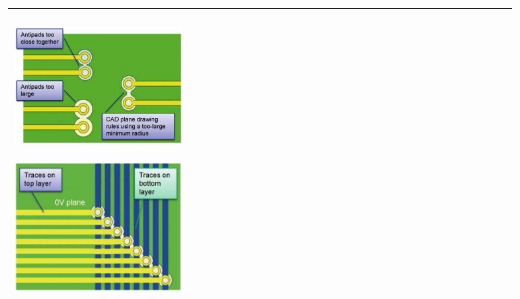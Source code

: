 \begin{table}[h!]
\begin{tabular}{|m{}|m{}|}
				 \begin{center}\includegraphics[width=0.35\textwidth]{images/BadAntipads.png}\end{center} 
				 \begin{center}\includegraphics[width=0.35\textwidth]{images/Traces.png}\end{center} 
			\\
			\hline
			\end{tabular}
		\end{table}	

